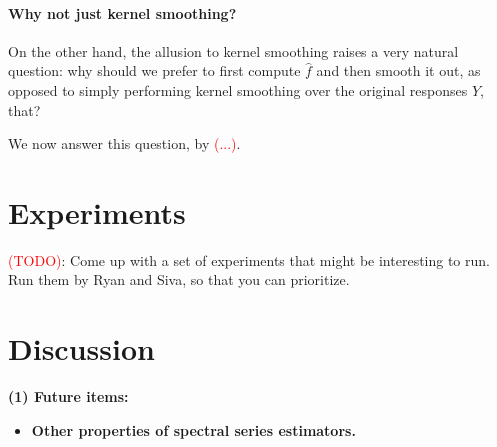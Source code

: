 \documentclass{article}
\newcommand{\1}{\mathbf{1}}
\newcommand{\wh}[1]{\widehat{#1}}
\theoremstyle{alden}
\theoremstyle{aldenthm}
\theoremstyle{definition}
\theoremstyle{remark}
\begin{document}
\paragraph{Why not just kernel smoothing?}
On the other hand, the allusion to kernel smoothing raises a very natural question: why should we prefer to first compute $\wh{f}$ and then smooth it out, as opposed to simply performing kernel smoothing over the original responses $Y$, that?

We now answer this question, by \textcolor{red}{(...)}.

\section{Experiments}
\label{sec:experiments}

\textcolor{red}{(TODO)}: Come up with a set of experiments that might be interesting to run. Run them by Ryan and Siva, so that you can prioritize.

\section{Discussion}
\label{sec:discussion}

\textbf{(1) Future items:}
\begin{itemize}
	\item \textbf{Other properties of spectral series estimators.}
\end{itemize}



 

\appendix


\end{document}
